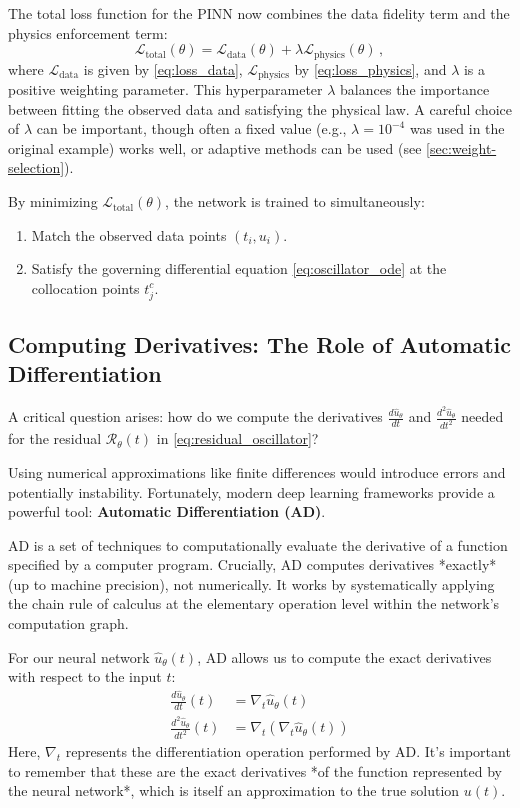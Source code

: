 The total loss function for the PINN now combines the data fidelity term and the physics enforcement term:
%
\begin{equation}
\mathcal{L}_{\text{total}}(\theta) = \mathcal{L}_{\text{data}}(\theta) + \lambda\mathcal{L}_{\text{physics}}(\theta) \,,
\label{eq:loss_total_pinn}
\end{equation}
%
where $\mathcal{L}_{\text{data}}$ is given by \cref{eq:loss_data}, $\mathcal{L}_{\text{physics}}$ by \cref{eq:loss_physics}, and $\lambda$ is a positive weighting parameter. This hyperparameter $\lambda$ balances the importance between fitting the observed data and satisfying the physical law. A careful choice of $\lambda$ can be important, though often a fixed value (e.g., $\lambda = 10^{-4}$ was used in the original example) works well, or adaptive methods can be used (see \cref{sec:weight-selection}).

By minimizing $\mathcal{L}_{\text{total}}(\theta)$, the network is trained to simultaneously:
\begin{enumerate}
    \item Match the observed data points $(t_i, u_i)$.
    \item Satisfy the governing differential equation \eqref{eq:oscillator_ode} at the collocation points $t_j^c$.
\end{enumerate}

\subsection{Computing Derivatives: The Role of Automatic Differentiation}

A critical question arises: how do we compute the derivatives $\frac{d\hat{u}_\theta}{dt}$ and $\frac{d^2\hat{u}_\theta}{dt^2}$ needed for the residual $\mathcal{R}_\theta(t)$ in \cref{eq:residual_oscillator}?

Using numerical approximations like finite differences would introduce errors and potentially instability. Fortunately, modern deep learning frameworks provide a powerful tool: \textbf{Automatic Differentiation (AD)}.

AD is a set of techniques to computationally evaluate the derivative of a function specified by a computer program. Crucially, AD computes derivatives *exactly* (up to machine precision), not numerically. It works by systematically applying the chain rule of calculus at the elementary operation level within the network's computation graph.

For our neural network $\hat{u}_\theta(t)$, AD allows us to compute the exact derivatives with respect to the input $t$:
%
\begin{align*}
\frac{d\hat{u}_\theta}{dt}(t) &= \nabla_t \hat{u}_\theta(t) \\
\frac{d^2\hat{u}_\theta}{dt^2}(t) &= \nabla_t \left(\nabla_t \hat{u}_\theta(t)\right)
\end{align*}
%
Here, $\nabla_t$ represents the differentiation operation performed by AD. It's important to remember that these are the exact derivatives *of the function represented by the neural network*, which is itself an approximation to the true solution $u(t)$.

